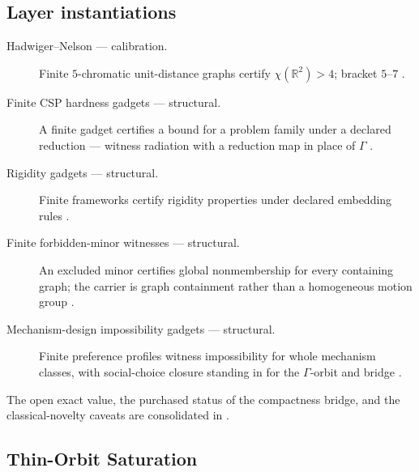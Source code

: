 \documentclass[11pt]{article}
\newcommand{\lawGThirteen}{Thin-Orbit Saturation}
\theoremstyle{definition}
\begin{document}
\subsection*{Layer instantiations}\label{layer-inst:G12}
\begin{description}
  \item[Hadwiger--Nelson --- calibration.] Finite $5$-chromatic unit-distance graphs certify
    $\chi(\mathbb{R}^2) > 4$; bracket $5$--$7$
    \citep{DeGrey2018,Heule2018,Parts2020,BruijnErdos1951}.
  \item[Finite CSP hardness gadgets --- structural.] A finite gadget certifies a bound for a problem
    family under a declared reduction --- witness radiation with a reduction map in place of $\Gamma$
    \citep{GareyJohnsonStockmeyer1976}.
  \item[Rigidity gadgets --- structural.] Finite frameworks certify rigidity properties under
    declared embedding rules \citep{Laman1970,AsimowRoth1978}.
  \item[Finite forbidden-minor witnesses --- structural.] An excluded minor certifies global
    nonmembership for every containing graph; the carrier is graph containment rather than a
    homogeneous motion group \citep{RobertsonSeymour2004}.
  \item[Mechanism-design impossibility gadgets --- structural.] Finite preference profiles witness
    impossibility for whole mechanism classes, with social-choice closure standing in for the
    $\Gamma$-orbit and bridge \citep{Gibbard1973,Satterthwaite1975}.
\end{description}

The open exact value, the purchased status of the compactness bridge, and the classical-novelty
caveats are consolidated in .

\subsection{\lawGThirteen}\label{sec:clusterD:g13}
\end{document}
